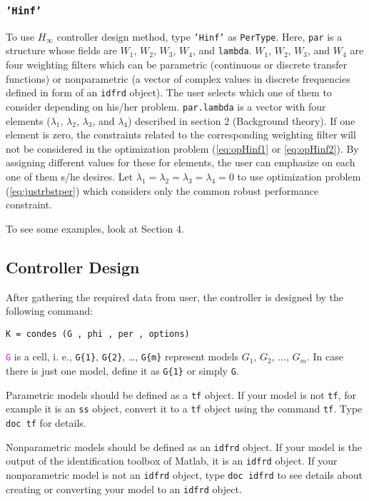 \documentclass [12pt , a4paper] {article}
\begin{document}
\subsubsection{\texttt{'Hinf'}} 
To use $H_\infty$ controller design method, type \texttt{'Hinf'} as \texttt{PerType}. Here, \texttt{par} is a structure whose fields are \texttt{$W_1$}, \texttt{$W_2$}, \texttt{$W_3$}, \texttt{$W_4$}, and \texttt{lambda}. \texttt{$W_1$}, \texttt{$W_2$}, \texttt{$W_3$}, and \texttt{$W_4$} are four weighting filters which can be parametric (continuous or discrete transfer functions) or nonparametric (a vector of complex values in discrete frequencies defined in form of an \texttt{idfrd} object). The user selects which one of them to consider depending on his/her problem. \texttt{par.lambda} is a vector with four elements ($\lambda_1$, $\lambda_2$, $\lambda_3$, and $\lambda_4$) described in section 2 (Background theory). If one element is zero, the constraints related to the corresponding weighting filter will not be considered in the optimization problem (\ref{eq:opHinf1} or \ref{eq:opHinf2}). By assigning different values for these for elements, the user can emphasize on each one of them s/he desires. Let $\lambda_1=\lambda_2=\lambda_3=\lambda_4=0$ to use optimization problem (\ref{eq:justrbstper}) which considers only the common robust performance constraint.

To see some examples, look at Section 4.

\subsection{Controller Design}
After gathering the required data from user, the controller is designed by the following command:

\begin{lstlisting}  
K = condes (G , phi , per , options)
\end{lstlisting}
\textcolor{magenta}{\texttt{G}} is a cell, i. e., \texttt{G\{1\}}, \texttt{G\{2\}}, \dots, \texttt{G\{m\}} represent models $G_1$, $G_2$, $\ldots$, $G_m$. In case there is just one model, define it as \texttt{G\{1\}} or simply \texttt{G}. 

Parametric models should be defined as a \texttt{tf} object. If your model is not \texttt{tf}, for example it is an \texttt{ss} object, convert it to a \texttt{tf} object using the command \texttt{tf}. Type \texttt{doc tf} for details.

Nonparametric models should be defined as an \texttt{idfrd} object. If your model is the output of the identification toolbox of Matlab, it is an \texttt{idfrd} object. If your nonparametric model is not an \texttt{idfrd} object, type \texttt{doc idfrd} to see details about creating or converting your model to an \texttt{idfrd} object.
\end{document}
